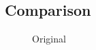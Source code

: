     \subsection{Comparison}
    \begin{figure}[!htb]\centering
        \begin{minipage}{0.40\textwidth}
            \caption{Original}
        \end{minipage}
        \begin{minipage}{0.40\textwidth}

\end{minipage}
\end{figure}
